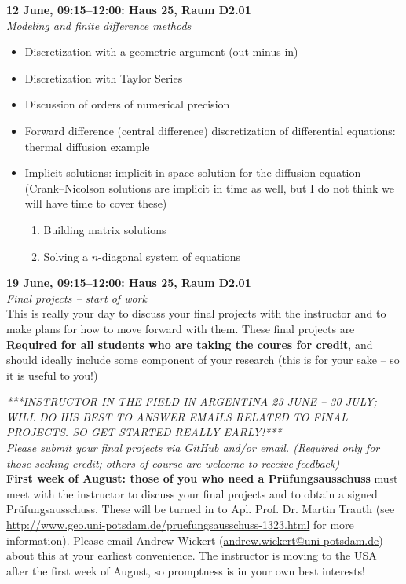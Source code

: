 \documentclass[10pt,a4paper]{amsart}
\begin{document}
\begin{minipage}{\linewidth}
\noindent \textbf{12 June, 09:15--12:00: Haus 25, Raum D2.01}\\
\textit{Modeling and finite difference methods}
\begin{itemize}
 \item Discretization with a geometric argument (out minus in)
 \item Discretization with Taylor Series
 \item Discussion of orders of numerical precision
 \item Forward difference (central difference) discretization of differential equations: thermal diffusion example
 \item Implicit solutions: implicit-in-space solution for the diffusion equation (Crank--Nicolson solutions are implicit in time as well, but I do not think we will have time to cover these)
 \begin{enumerate}
  \item Building matrix solutions
  \item Solving a $n$-diagonal system of equations
 \end{enumerate}
\end{itemize}
\vspace{12pt}
\end{minipage}

\begin{minipage}{\linewidth}
\noindent \textbf{19 June, 09:15--12:00: Haus 25, Raum D2.01}\\
\textit{Final projects -- start of work}\\
This is really your day to discuss your final projects with the instructor and to make plans for how to move forward with them. These final projects are \textbf{Required for all students who are taking the coures for credit}, and should ideally include some component of your research (this is for your sake -- so it is useful to you!)
\vspace{12pt}
\end{minipage}

\noindent\emph{***INSTRUCTOR IN THE FIELD IN ARGENTINA 23 JUNE -- 30 JULY; WILL DO HIS BEST TO ANSWER EMAILS RELATED TO FINAL PROJECTS. SO GET STARTED REALLY EARLY!***}\\

\noindent\emph{Please submit your final projects via GitHub and/or email. (Required only for those seeking credit; others of course are welcome to receive feedback)}\\

\noindent\textbf{First week of August: those of you who need a Prüfungsausschuss} must meet with the instructor to discuss your final projects and to obtain a signed Prüfungsausschuss. These will be turned in to Apl. Prof. Dr. Martin Trauth (see \url{http://www.geo.uni-potsdam.de/pruefungsausschuss-1323.html} for more information). Please email Andrew Wickert (\url{andrew.wickert@uni-potsdam.de}) about this at your earliest convenience. The instructor is moving to the USA after the first week of August, so promptness is in your own best interests!
\end{document}
